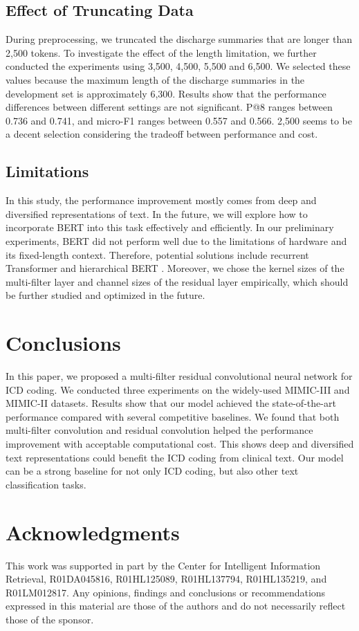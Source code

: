 \documentclass[letterpaper]{article} \usepackage{aaai20}  \usepackage{times}  \usepackage{helvet} \usepackage{courier}  \usepackage[hyphens]{url}  \usepackage{graphicx} \urlstyle{rm} \def\UrlFont{\rm}  \usepackage{graphicx}  \frenchspacing  \setlength{\pdfpagewidth}{8.5in}  \setlength{\pdfpageheight}{11in}
\begin{document}
\subsection{Effect of Truncating Data}

During preprocessing, we truncated the discharge summaries that are longer than 2,500 tokens. To investigate the effect of the length limitation, we further conducted the experiments using 3,500, 4,500, 5,500 and 6,500. We selected these values because the maximum length of the discharge summaries in the development set is approximately 6,300. Results show that the performance differences between different settings are not significant. P@8 ranges between 0.736 and 0.741, and micro-F1 ranges between 0.557 and 0.566. 2,500 seems to be a decent selection considering the tradeoff between performance and cost.



\subsection{Limitations}
In this study, the performance improvement mostly comes from deep and diversified representations of text. In the future, we will explore how to incorporate BERT \cite{devlin-etal-2019-bert} into this task effectively and efficiently. In our preliminary experiments, BERT did not perform well due to the limitations of hardware and its fixed-length context. Therefore, potential solutions include recurrent Transformer \cite{dai-etal-2019-transformer} and hierarchical BERT \cite{zhang-etal-2019-hibert}. Moreover, we chose the kernel sizes of the multi-filter layer and channel sizes of the residual layer empirically, which should be further studied and optimized in the future. 


\section{Conclusions}

In this paper, we proposed a multi-filter residual convolutional neural network for ICD coding. We conducted three experiments on the widely-used MIMIC-III and MIMIC-II datasets. Results show that our model achieved the state-of-the-art performance compared with several competitive baselines. We found that both multi-filter convolution and residual convolution helped the performance improvement with acceptable computational cost. This shows deep and diversified text representations could benefit the ICD coding from clinical text. Our model can be a strong baseline for not only ICD coding, but also other text classification tasks. 

\section{Acknowledgments}
This work was supported in part by the Center for Intelligent Information Retrieval, R01DA045816, R01HL125089, R01HL137794, R01HL135219, and R01LM012817. Any opinions, findings and conclusions or recommendations expressed in this material are those of the authors and do not necessarily reflect those of the sponsor.




\end{document}
